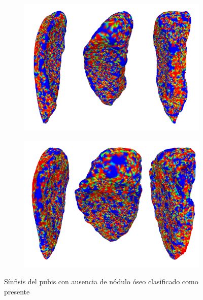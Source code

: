 \begin{figure}[p]
    \centering
    \begin{subfigure}{\textwidth}
    \includegraphics[width=\textwidth]{imagenes/experiments/bone21_heat.png}
    \end{subfigure}
    \centering
    \begin{subfigure}{\textwidth}
    \includegraphics[width=\textwidth]{imagenes/experiments/bone50_heat.png}
    \end{subfigure}
    \caption[Nódulo óseo ausente mal clasificado, mapas de activación]{Sínfisis del pubis con ausencia de nódulo óseo clasificado como presente}
    \label{fig:heatmap_absent_false}
\end{figure}


